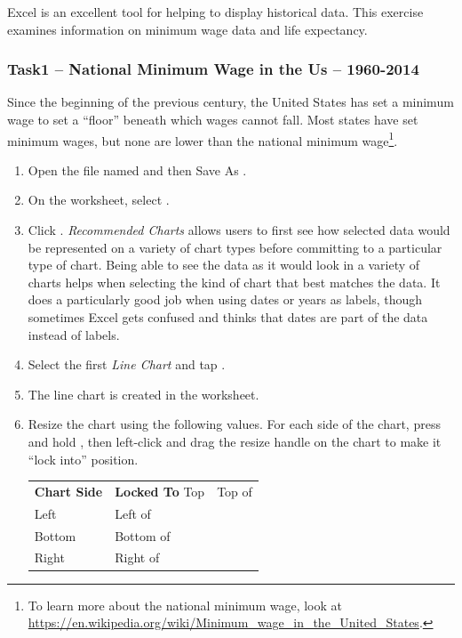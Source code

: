 Excel is an excellent tool for helping to display historical data. This exercise examines information on minimum wage data and life expectancy.

\subsubsection{Task1 – National Minimum Wage in the Us – 1960-2014}

Since the beginning of the previous century, the United States has set a minimum wage to set a ``floor'' beneath which wages cannot fall. Most states have set minimum wages, but none are lower than the national minimum wage\footnote{To learn more about the national minimum wage, look at \url{https://en.wikipedia.org/wiki/Minimum_wage_in_the_United_States}.}.

\begin{enumbox}
	\begin{enumerate}
		\item Open the file named  and then Save As .
		\item On the  worksheet, select .
		\item Click . \textit{Recommended Charts} allows users to first see how selected data would be represented on a variety of chart types before committing to a particular type of chart. Being able to see the data as it would look in a variety of charts helps when selecting the kind of chart that best matches the data. It does a particularly good job when using dates or years as labels, though sometimes Excel gets confused and thinks that dates are part of the data instead of labels.
		\item Select the first \textit{Line Chart} and tap .
		\item The line chart is created in the  worksheet.
		\item Resize the chart using the following values. For each side of the chart, press and hold , then left-click and drag the resize handle on the chart to make it ``lock into'' position.
	
		\begin{table}[H]
		\captionsetup{labelformat=empty} %
		{\small
			\begin{longtable}{R{0.75in}L{1.50in}} %
				\textbf{Chart Side} & \textbf{Locked To} \endhead
				\hline
				Top & Top of \\
				Left & Left of \\
				Bottom & Bottom of \\
				Right & Right of \\
			\end{longtable}
		} %
		\end{table}
	

\end{enumerate}
\end{enumbox}
